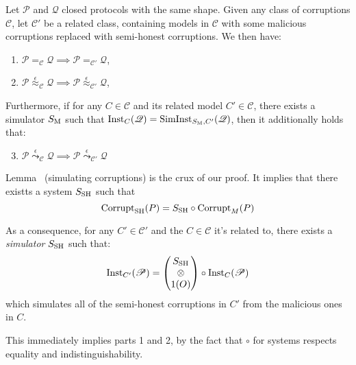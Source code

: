 \begin{theorem}
  \label{thm:mal_complete}
  Let $\mathscr{P}$ and $\mathscr{Q}$ closed protocols with the same shape.
  Given any class of corruptions $\mathscr{C}$, let $\mathscr{C}'$ be a related class, containing
  models in $\mathscr{C}$ with some
  malicious corruptions replaced with semi-honest corruptions.
  We then have:
  \begin{enumerate}
    \item $\mathscr{P} =_{\mathscr{C}} \mathscr{Q} \implies \mathscr{P} =_{\mathscr{C}'} \mathscr{Q}$,
    \item $\mathscr{P} \overset{\epsilon}{\approx}_{\mathscr{C}} \mathscr{Q} \implies \mathscr{P} \overset{\epsilon}{\approx}_{\mathscr{C}'} \mathscr{Q}$,
  \end{enumerate}
  Furthermore, if for any $C \in \mathscr{C}$ and its related model $C' \in \mathscr{C}$,
  there exists a simulator $S_{\text{M}}$ such that $\text{Inst}_C(\mathscr{Q}) = \text{SimInst}_{S_{\text{M}}, C'}(\mathscr{Q})$,
  then it additionally holds that:
  \begin{enumerate}
    \setcounter{enumi}{2}
    \item $\mathscr{P} \overset{\epsilon}{\leadsto}_{\mathscr{C}} \mathscr{Q} \implies \mathscr{P} \overset{\epsilon}{\leadsto}_{\mathscr{C}'} \mathscr{Q}$
  \end{enumerate}

   Lemma~\label{thm:simulatingcorruption} (simulating corruptions) is the crux of our proof.
  It implies that there existts a system $S_{\text{SH}}$ such that
  $$
  \text{Corrupt}_{\text{SH}}(P) = S_{\text{SH}} \circ \text{Corrupt}_M(P)
  $$

  As a consequence, for any $C' \in \mathscr{C}'$ and the $C \in \mathscr{C}$ it's related to,
  there exists a \emph{simulator} $S_{\text{SH}}$ such that:
  $$
  \text{Inst}_{C'}(\mathscr{P}) =
  \begin{pmatrix}
    S_{\text{SH}}\cr
    \otimes\cr
    1(O)
  \end{pmatrix}
  \circ \text{Inst}_{C}(\mathscr{P})
  $$
  which simulates all of the semi-honest corruptions in $C'$ from the malicious ones in $C$.

  This immediately implies parts 1 and 2, by the fact that $\circ$ for systems
  respects equality and indistinguishability.


\end{theorem}
